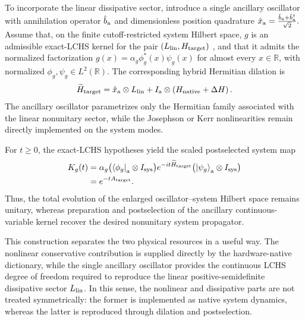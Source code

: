 \documentclass[pra,twocolumn,superscriptaddress,nofootinbib,floatfix]{revtex4-2}
\theoremstyle{remark}
\newcommand{\revcolor}{\color{blue}}
\begin{document}
To incorporate the linear dissipative sector, introduce a single ancillary oscillator with annihilation operator \(\hat b_{\rm a}\) and dimensionless position quadrature $\hat x_{\rm a}=\frac{\hat b_{\rm a}+\hat b_{\rm a}^{\dagger}}{\sqrt{2}}.$ Assume that, on the finite cutoff-restricted system Hilbert space, \(g\) is an admissible exact-LCHS kernel for the pair \(\left(L_{\rm lin},H_{\rm target}\right)\) \cite{An_2023,An_2026}, and that it admits the normalized factorization \(g(x)=\alpha_g\phi_g^{*}(x)\psi_g(x)\) for almost every \(x\in\mathbb R\), with normalized \(\phi_g,\psi_g\in L^2(\mathbb R).\) The corresponding hybrid Hermitian dilation is
\begin{align}
\widetilde H_{\rm target}=\hat x_{\rm a}\otimes L_{\rm lin}+I_{\rm a}\otimes\left(H_{\rm native}+\Delta H\right).
\label{eq:hybrid-target-hamiltonian}
\end{align}
The ancillary oscillator parametrizes only the Hermitian family associated with the linear nonunitary sector, while the Josephson or Kerr nonlinearities remain directly implemented on the system modes.

For \(t\geq0\), the exact-LCHS hypotheses yield the scaled postselected system map~\cite[Theorem~1]{das2026quantumdifferentialequationsolver}
\begingroup\revcolor
\begin{align}
K_g(t)&=\alpha_g\bigl(\bra{\phi_g}_{\rm a}\otimes I_{\rm sys}\bigr)e^{-it\widetilde H_{\rm target}}\bigl(\ket{\psi_g}_{\rm a}\otimes I_{\rm sys}\bigr)\nonumber\\
&=e^{-tA_{\rm target}}.
\label{eq:exact-one-mode-dilation}
\end{align}
\endgroup
Thus, the total evolution of the enlarged oscillator--system Hilbert space remains unitary, whereas preparation and postselection of the ancillary continuous-variable kernel recover the desired nonunitary system propagator.

This construction separates the two physical resources in a useful way. The nonlinear conservative contribution is supplied directly by the hardware-native dictionary, while the single ancillary oscillator provides the continuous LCHS degree of freedom required to reproduce the linear positive-semidefinite dissipative sector \(L_{\rm lin}\). In this sense, the nonlinear and dissipative parts are not treated symmetrically: the former is implemented as native system dynamics, whereas the latter is reproduced through dilation and postselection.
\end{document}
